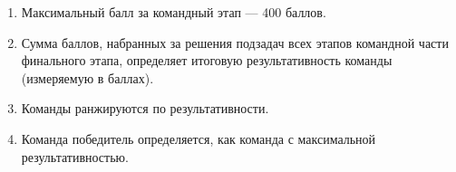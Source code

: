 \begin{enumerate}
    \item Максимальный балл за командный этап --- 400 баллов.
    \item Сумма баллов, набранных за решения подзадач всех этапов командной части финального этапа, определяет итоговую результативность команды (измеряемую в баллах).
    \item Команды ранжируются по результативности.
    \item Команда победитель определяется, как команда с максимальной результативностью.
\end{enumerate} 